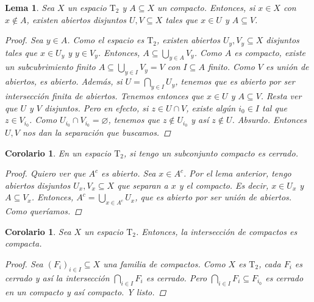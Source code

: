 \documentclass[12pt]{book}
\newtheorem{lem}[teo]{Lema}
\newtheorem{cor}[teo]{Corolario}
\theoremstyle{definition}
\let\emptyset\varnothing
\begin{document}
\begin{lem}
Sea $X$ un espacio $\mathrm{T}_2$ y $A\subseteq X$ un compacto. Entonces, si $x\in X$ con $x\notin A$, existen abiertos disjuntos $U,V\subseteq X$ tales que $x\in U$ y $A\subseteq V$.
\begin{proof}
Sea $y\in A$. Como el espacio es $\mathrm{T}_2$, existen abiertos $U_y,V_y\subseteq X$ disjuntos tales que $x\in U_y$ y $y\in V_y$. Entonces, $A\subseteq \displaystyle\bigcup_{y\in A}V_y$. Como $A$ es compacto, existe un subcubrimiento finito $A\subseteq \displaystyle\bigcup_{y\in I}V_y = V$ con $I\subseteq A$ finito. Como $V$ es unión de abiertos, es abierto. Además, si $U=\displaystyle\bigcap_{y\in I} U_y$, tenemos que es abierto por ser intersección finita de abiertos. Tenemos entonces que $x\in U$ y $A\subseteq V$. Resta ver que $U$ y $V$ disjuntos. Pero en efecto, si $z\in U\cap V$, existe algún $i_0\in I$ tal que $z\in V_{i_0}$. Como $U_{i_0}\cap V_{i_0}=\emptyset$, tenemos que $z\notin U_{i_0}$ y así $z\notin U$. Absurdo. Entonces $U,V$ nos dan la separación que buscamos.
\end{proof}
\end{lem}

\begin{cor}
En un espacio $\mathrm{T}_2$, si tengo un subconjunto compacto es cerrado.
\begin{proof}
Quiero ver que $A^c$ es abierto. Sea $x\in A^c$. Por el lema anterior, tengo abiertos disjuntos $U_x,V_x\subseteq X$ que separan a $x$ y el compacto. Es decir, $x\in U_x$ y $A\subseteq V_x$. Entonces, $A^c = \displaystyle\bigcup_{x\in A^c} U_x$, que es abierto por ser unión de abiertos. Como queríamos.
\end{proof}
\end{cor}

\begin{cor}
Sea $X$ un espacio $\mathrm{T}_2$. Entonces, la intersección de compactos es compacta.
\begin{proof}
Sea $(F_i)_{i\in I}\subseteq X$ una familia de compactos. Como $X$ es $\mathrm{T}_2$, cada $F_i$ es cerrado y así la intersección $\displaystyle\bigcap_{i\in I}F_i$ es cerrado. Pero $\displaystyle\bigcap_{i\in I}F_i \subseteq F_{i_0}$ es cerrado en un compacto y así compacto. Y listo.
\end{proof}
\end{cor}
\end{document}
